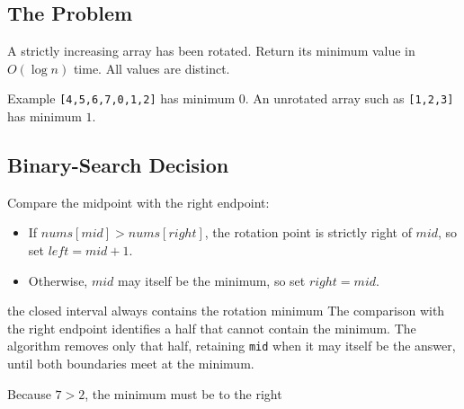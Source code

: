 
\subsection{The Problem}
A strictly increasing array has been rotated. Return its minimum value in
\(O(\log n)\) time. All values are distinct.

\begin{conceptbox}{Example}
\texttt{[4,5,6,7,0,1,2]} has minimum \(0\). An unrotated array such as
\texttt{[1,2,3]} has minimum \(1\).
\end{conceptbox}

\subsection{Binary-Search Decision}
Compare the midpoint with the right endpoint:
\begin{itemize}
  \item If \(nums[mid]>nums[right]\), the rotation point is strictly right of
  \(mid\), so set \(left=mid+1\).
  \item Otherwise, \(mid\) may itself be the minimum, so set \(right=mid\).
\end{itemize}

\begin{invariantbox}{the closed interval always contains the rotation minimum}
The comparison with the right endpoint identifies a half that cannot contain
the minimum. The algorithm removes only that half, retaining \texttt{mid}
when it may itself be the answer, until both boundaries meet at the minimum.
\end{invariantbox}

\begin{visualbox}{Because \(7>2\), the minimum must be to the right}
\centering
{}
\end{visualbox}

